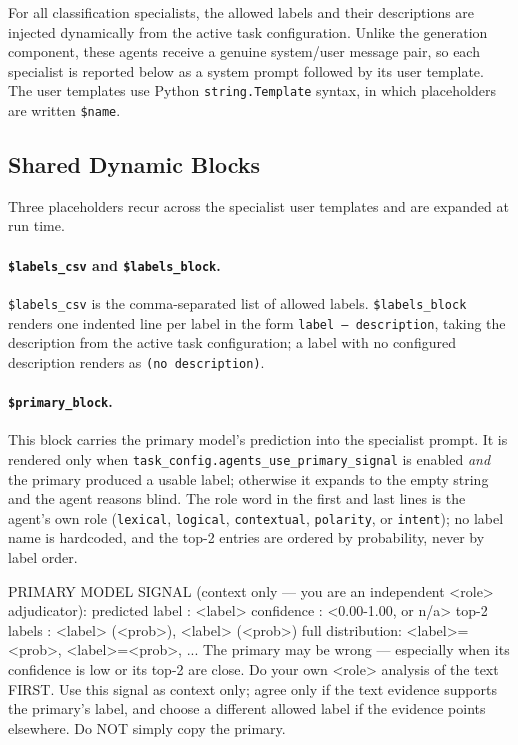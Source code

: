 For all classification specialists, the allowed labels and their descriptions
are injected dynamically from the active task configuration. Unlike the
generation component, these agents receive a genuine system/user message pair,
so each specialist is reported below as a system prompt followed by its user
template. The user templates use Python \texttt{string.Template} syntax, in
which placeholders are written \texttt{\$name}.

\subsection{Shared Dynamic Blocks}
\label{app:prompts:shared-blocks}

Three placeholders recur across the specialist user templates and are expanded
at run time.

\paragraph{\texttt{\$labels\_csv} and \texttt{\$labels\_block}.}
\texttt{\$labels\_csv} is the comma-separated list of allowed labels.
\texttt{\$labels\_block} renders one indented line per label in the form
\texttt{label --- description}, taking the description from the active task
configuration; a label with no configured description renders as
\texttt{(no description)}.

\paragraph{\texttt{\$primary\_block}.}
This block carries the primary model's prediction into the specialist prompt.
It is rendered only when \texttt{task\_config.agents\_use\_primary\_signal} is
enabled \emph{and} the primary produced a usable label; otherwise it expands to
the empty string and the agent reasons blind. The role word in the first and
last lines is the agent's own role (\texttt{lexical}, \texttt{logical},
\texttt{contextual}, \texttt{polarity}, or \texttt{intent}); no label name is
hardcoded, and the top-2 entries are ordered by probability, never by label
order.

\begin{Prompt}
PRIMARY MODEL SIGNAL (context only — you are an independent <role> adjudicator):
  predicted label  : <label>
  confidence       : <0.00-1.00, or n/a>
  top-2 labels     : <label> (<prob>), <label> (<prob>)
  full distribution: <label>=<prob>, <label>=<prob>, ...
The primary may be wrong — especially when its confidence is low or its top-2 are close. Do your own <role> analysis of the text FIRST. Use this signal as context only; agree only if the text evidence supports the primary's label, and choose a different allowed label if the evidence points elsewhere. Do NOT simply copy the primary.
\end{Prompt}

